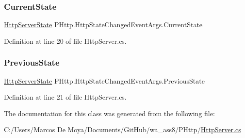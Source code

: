 \subsubsection{\texorpdfstring{Current\+State}{CurrentState}}
{\footnotesize\ttfamily \hyperlink{namespace_p_http_a8a92bffd93830785b58d0be3a2f5fdd4}{Http\+Server\+State} P\+Http.\+Http\+State\+Changed\+Event\+Args.\+Current\+State\hspace{0.3cm}{\ttfamily [get]}}



Definition at line 20 of file Http\+Server.\+cs.

\mbox{\label{class_p_http_1_1_http_state_changed_event_args_a3628b07b237a39f93817d7c79d6315a4}} 
\subsubsection{\texorpdfstring{Previous\+State}{PreviousState}}
{\footnotesize\ttfamily \hyperlink{namespace_p_http_a8a92bffd93830785b58d0be3a2f5fdd4}{Http\+Server\+State} P\+Http.\+Http\+State\+Changed\+Event\+Args.\+Previous\+State\hspace{0.3cm}{\ttfamily [get]}}



Definition at line 21 of file Http\+Server.\+cs.



The documentation for this class was generated from the following file\+:\begin{DoxyCompactItemize}
\item 
C\+:/\+Users/\+Marcos De Moya/\+Documents/\+Git\+Hub/wa\+\_\+ass8/\+P\+Http/\hyperlink{_http_server_8cs}{Http\+Server.\+cs}\end{DoxyCompactItemize}
